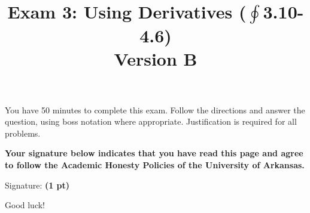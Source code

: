 \documentclass[12pt]{article}
\title{\vspace{-8pc}
\vfill{\Huge
	\bf Exam 3: Using Derivatives ($\textstyle\oint$3.10-4.6)} \\
	Version B
	}
\author{}
\date{}
\begin{document}
\maketitle
\vspace{-3pc}
 You have 50 minutes to complete this exam.  Follow the directions and answer the question, using boss notation where appropriate.  Justification is required for all problems. 

\vspace{2pc}
\noindent\textbf{Your signature below indicates that you have read this page and agree to follow the Academic Honesty Policies of the University of Arkansas.}  

\vfill
\noindent Signature: {\bf (1 pt)} \underline{\hspace{73ex}}
\begin{flushright}\Large Good luck!\end{flushright}
\end{document}
